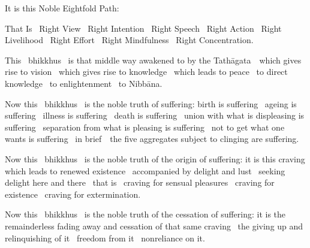 \medskip

\begin{english-hang}
  It is this Noble Eightfold Path:
\end{english-hang}

\medskip

\begin{english-hang}
  That Is \breathmark\ Right View \breathmark\ Right Intention \breathmark\ Right Speech \breathmark\ Right Action \breathmark\ Right Livelihood \breathmark\ Right Effort \breathmark\ Right Mindfulness \breathmark\ Right Concentration.
\end{english-hang}

\medskip

\begin{english-hang}
  This \breathmark\ bhikkhus \breathmark\ is that middle way awakened to by the \mbox{Tathāgata}~\breathmark\ which gives rise to vision \breathmark\ which gives rise to knowledge \breathmark\ which leads to peace \breathmark\ to direct knowledge \breathmark\ to enlightenment \breathmark\ to Nibbāna.
\end{english-hang}

\medskip

\begin{english-hang}
  Now this \breathmark\ bhikkhus \breathmark\ is the noble truth of suffering: birth is suffering \breathmark\ ageing is suffering \breathmark\ illness is suffering \breathmark\ death is suffering \breathmark\ union with what is displeasing is suffering \breathmark\ separation from what is pleasing is suffering \breathmark\ not to get what one wants is suffering \breathmark\ in \mbox{brief}~\breathmark\ the five aggregates subject to clinging are suffering.
\end{english-hang}

\medskip

\begin{english-hang}
  Now this \breathmark\ bhikkhus \breathmark\ is the noble truth of the origin of suffering: it is this craving which leads to renewed existence \breathmark\ accompanied by delight and lust \breathmark\ seeking delight here and there \breathmark\ that is \breathmark\ craving for sensual pleasures \breathmark\ craving for existence \breathmark\ craving for extermination.
\end{english-hang}

\medskip

\begin{english-hang}
  Now this \breathmark\ bhikkhus \breathmark\ is the noble truth of the cessation of suffering: it is the remainderless fading away and cessation of that same craving \breathmark\ the giving up and relinquishing of it \breathmark\ freedom from it \breathmark\ nonreliance on it.
\end{english-hang}

